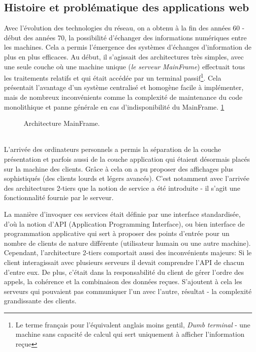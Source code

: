 \subsection{Histoire et problématique des applications web}
Avec l'évolution des technologies du réseau, on a obtenu à la fin des années 60 - début des années 70,  la possibilité d'échanger des informations numériques entre les machines. Cela a permis l'émergence des systèmes d'échanges d'information de plus en plus efficaces. Au début, il s'agissait des architectures très simples, avec une seule couche où une machine unique (\emph{le serveur MainFrame}) effectuait tous les traitements relatifs et qui était accédée par un terminal passif\footnote{Le terme français pour l'équivalent anglais moins gentil, \emph{Dumb terminal} - une machine sans capacité de calcul qui sert uniquement à afficher l'information reçue}. Cela présentait l'avantage d'un système centralisé et homogène facile à implémenter, mais de nombreux inconvénients comme la complexité de maintenance du code monolithique et panne générale en cas d'indisponibilité du MainFrame. \ref{fig:mainframe} 
\begin{figure}[h!]
	\centering
\caption{Architecture MainFrame.}
\label{fig:mainframe}
\end{figure}
\\
L'arrivée des ordinateurs personnels a permis la séparation de la couche présentation et parfois aussi  de la couche application qui étaient désormais placés sur la machine des clients. Grâce à cela on a pu proposer des affichages plus sophistiqués (des clients lourds et légers avancés). C'est notamment avec l'arrivée des architectures 2-tiers que la notion de service a été introduite - il s'agit une fonctionnalité fournie par le serveur.


La manière d'invoquer ces services était définie par une interface standardisée, d'où la notion d'API (Application Programming Interface), ou bien interface de programmation applicative qui sert à proposer des points d'entrée pour un nombre de clients de nature différente (utilisateur humain ou une autre machine).
\\ 
Cependant, l'architecture 2-tiers comportait aussi des inconvénients majeurs:
Si le client interagissait avec plusieurs serveurs il devait comprendre l'API de chacun d'entre eux. De plus, c'était dans la responsabilité du client de gérer l'ordre des appels, la cohérence et la combinaison des données reçues. S'ajoutent à cela les serveurs qui pouvaient pas communiquer l'un avec l'autre, résultat - la complexité grandissante des clients. 


